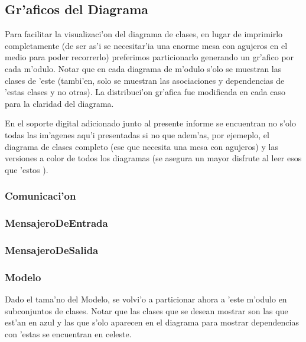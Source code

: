 \subsection{Gr'aficos del Diagrama}
Para facilitar la visualizaci'on del diagrama de clases, en lugar de imprimirlo completamente (de ser as'i se necesitar'ia una enorme mesa con agujeros en el medio para poder recorrerlo) preferimos particionarlo generando un gr'afico por cada m'odulo. Notar que en cada diagrama de m'odulo s'olo se muestran las clases de 'este (tambi'en, solo se muestran las asociaciones y dependencias de 'estas clases y no otras). La distribuci'on gr'afica fue modificada en cada caso para la claridad del diagrama. 

En el soporte digital adicionado junto al presente informe se encuentran no s'olo todas las im'agenes aqu'i presentadas si no que adem'as, por ejemeplo, el diagrama de clases completo (ese que necesita una mesa con agujeros) y las versiones a color de todos los diagramas (se asegura un mayor disfrute al leer esos que 'estos ).
\clearpage


\subsubsection{Comunicaci'on}
\clearpage

\subsubsection{MensajeroDeEntrada}
\clearpage

\subsubsection{MensajeroDeSalida}
\clearpage

\subsubsection{Modelo}
Dado el tama'no del Modelo, se volvi'o a particionar ahora a 'este m'odulo en subconjuntos de clases. Notar que las clases que se desean mostrar son las que est'an en azul y las que s'olo aparecen en el diagrama para mostrar dependencias con 'estas se encuentran en celeste.

